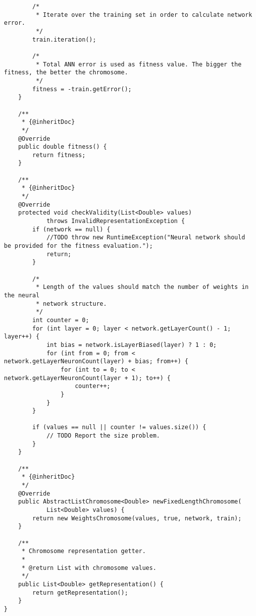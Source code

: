 \begin{verbatim}
        /*
         * Iterate over the training set in order to calculate network error.
         */
        train.iteration();

        /*
         * Total ANN error is used as fitness value. The bigger the fitness, the better the chromosome.
         */
        fitness = -train.getError();
    }

    /**
     * {@inheritDoc}
     */
    @Override
    public double fitness() {
        return fitness;
    }

    /**
     * {@inheritDoc}
     */
    @Override
    protected void checkValidity(List<Double> values)
            throws InvalidRepresentationException {
        if (network == null) {
            //TODO throw new RuntimeException("Neural network should be provided for the fitness evaluation.");
            return;
        }

        /*
         * Length of the values should match the number of weights in the neural
         * network structure.
         */
        int counter = 0;
        for (int layer = 0; layer < network.getLayerCount() - 1; layer++) {
            int bias = network.isLayerBiased(layer) ? 1 : 0;
            for (int from = 0; from < network.getLayerNeuronCount(layer) + bias; from++) {
                for (int to = 0; to < network.getLayerNeuronCount(layer + 1); to++) {
                    counter++;
                }
            }
        }

        if (values == null || counter != values.size()) {
            // TODO Report the size problem.
        }
    }

    /**
     * {@inheritDoc}
     */
    @Override
    public AbstractListChromosome<Double> newFixedLengthChromosome(
            List<Double> values) {
        return new WeightsChromosome(values, true, network, train);
    }

    /**
     * Chromosome representation getter.
     *
     * @return List with chromosome values.
     */
    public List<Double> getRepresentation() {
        return getRepresentation();
    }
}
\end{verbatim}

